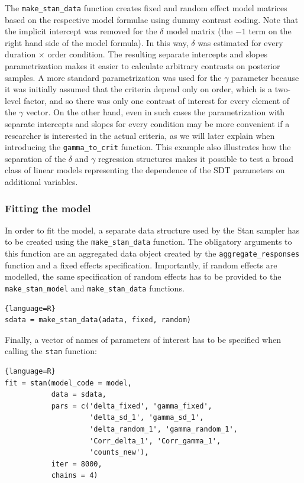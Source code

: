 \documentclass[a4paper,man,apacite,floatsintext]{apa6}
\newcommand{\code}[1]{\texttt{#1}}
\begin{document}
The \code{make\_stan\_data} function creates fixed and random effect
model matrices based on the respective model formulae using dummy
contrast coding. Note that the implicit intercept was removed for the
$\delta$ model matrix (the $-1$ term on the right hand side of the
model formula). In this way, $\delta$ was estimated for every duration
$\times$ order condition. The resulting separate intercepts and slopes
parametrization makes it easier to calculate arbitrary contrasts on
posterior samples. A more standard parametrization was used for the
$\gamma$ parameter because it was initially assumed that the criteria
depend only on order, which is a two-level factor, and so there was
only one contrast of interest for every element of the $\gamma$
vector. On the other hand, even in such cases the parametrization with
separate intercepts and slopes for every condition may be more
convenient if a researcher is interested in the actual criteria, as we
will later explain when introducing the \code{gamma\_to\_crit}
function. This example also illustrates how the separation of the
$\delta$ and $\gamma$ regression structures makes it possible to test
a broad class of linear models representing the dependence of the SDT
parameters on additional variables.

\subsubsection{Fitting the model}

In order to fit the model, a separate data structure used by the Stan
sampler has to be created using the \code{make\_stan\_data}
function. The obligatory arguments to this function are an aggregated
data object created by the \code{aggregate\_responses} function and a
fixed effects specification. Importantly, if random effects are
modelled, the same specification of random effects has to be provided
to the \code{make\_stan\_model} and \code{make\_stan\_data} functions.

\begin{lstlisting}{language=R}
sdata = make_stan_data(adata, fixed, random)
\end{lstlisting}

Finally, a vector of names of parameters of interest has to be
specified when calling the \code{stan} function:

\begin{lstlisting}{language=R}
fit = stan(model_code = model,
           data = sdata,
           pars = c('delta_fixed', 'gamma_fixed',
                    'delta_sd_1', 'gamma_sd_1',
                    'delta_random_1', 'gamma_random_1',
                    'Corr_delta_1', 'Corr_gamma_1',
                    'counts_new'),
           iter = 8000,
           chains = 4)
\end{lstlisting}
\end{document}
